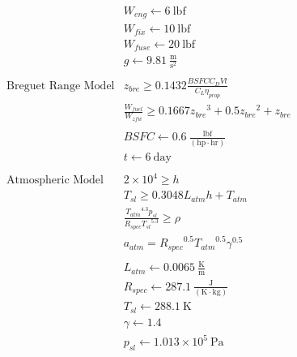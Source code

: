 \documentclass[10pt, a4paper]{article}
\begin{document}
\[\begin{array}{ll}
    & {W_{eng}} \gets 6~\mathrm{lbf} \\
    & {W_{fix}} \gets 10~\mathrm{lbf} \\
    & {W_{fuse}} \gets 20~\mathrm{lbf} \\
    & {g} \gets 9.81~\mathrm{\tfrac{m}{s^{2}}} \\
\text{} \\
\text{Breguet Range Model}
    & {z_{bre}} \geq 0.1432\frac{{BSFC} {C_D} {V} {t}}{{C_L} {\eta_{prop}}} \\
    & \frac{{W_{fuel}}}{{W_{zfw}}} \geq 0.1667{z_{bre}}^{3} + 0.5{z_{bre}}^{2} + {z_{bre}} \\
    \text{} \\
    & {BSFC} \gets 0.6~\mathrm{\tfrac{lbf}{\left(hp\cdot hr\right)}} \\
    & {t} \gets 6~\mathrm{day} \\
\text{} \\
\text{Atmospheric Model}
    & 2 \times 10^{4} \geq {h} \\
    & {T_{sl}} \geq 0.3048{L_{atm}} {h} + {T_{atm}} \\
    & \frac{{T_{atm}}^{4.3} {p_{sl}}}{{R_{spec}} {T_{sl}}^{5.3}} \geq {\rho} \\
    & {a_{atm}} = {R_{spec}}^{0.5} {T_{atm}}^{0.5} {\gamma}^{0.5} \\
    \text{} \\
    & {L_{atm}} \gets 0.0065~\mathrm{\tfrac{K}{m}} \\
    & {R_{spec}} \gets 287.1~\mathrm{\tfrac{J}{\left(K\cdot kg\right)}} \\
    & {T_{sl}} \gets 288.1~\mathrm{K} \\
    & {\gamma} \gets 1.4 \\
    & {p_{sl}} \gets 1.013 \times 10^{5}~\mathrm{Pa} \\
\end{array} \]
    
\end{document}
